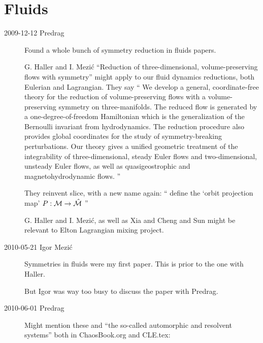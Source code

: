
\chapter{Fluids}
\label{chap:fluids}

\begin{description}

\item[2009-12-12 Predrag] Found a whole bunch of symmetry
reduction in fluids papers.

G. Haller and I. Mezi\'c
``Reduction of three-dimensional, volume-preserving flows
with symmetry''
might apply to our fluid dynamics reductions, both
Eulerian and Lagrangian.
They say ``
We develop a general, coordinate-free theory for the reduction
of volume-preserving flows with a volume-preserving symmetry on
three-manifolds. The reduced flow is generated by a
one-degree-of-freedom Hamiltonian which is the generalization
of the Bernoulli invariant from hydrodynamics. The reduction
procedure also provides global coordinates for the study of
symmetry-breaking perturbations. Our theory gives a unified
geometric treatment of the integrability of three-dimensional,
steady Euler flows and two-dimensional, unsteady Euler flows,
as well as quasigeostrophic and magnetohydrodynamic flows.
''

They reinvent slice, with a new name again:
``
define the `orbit projection map'
$P: {\cal M} \to \hat{\cal M} $
''

G. Haller and I. Mezi\'c, as well as Xia and Cheng
and Sun might be relevant to Elton
{Lagrangian mixing project}.

\item[2010-05-21 Igor Mezi\'c]
Symmetries in fluids were my first paper. This is prior to the
one with Haller.

But Igor was way too busy to discuss the paper with Predrag.

\item[2010-06-01 Predrag]
Might mention these and ``the so-called automorphic and resolvent systems''
both in ChaosBook.org and CLE.tex:


\end{description}
